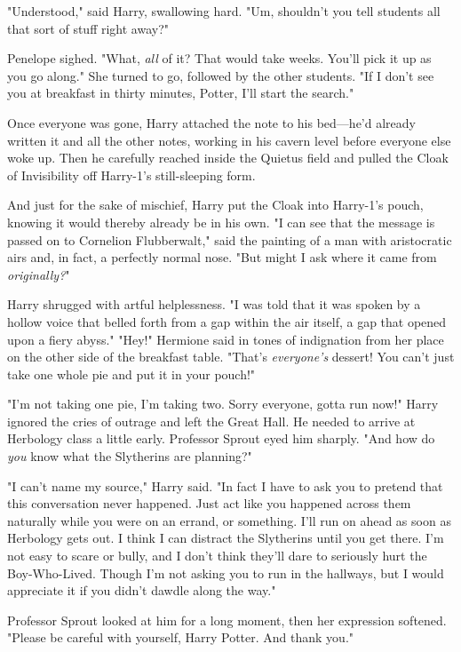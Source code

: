 "Understood," said Harry, swallowing hard. "Um, shouldn't you tell students all
that sort of stuff right away?"

Penelope sighed. "What, \emph{all} of it? That would take weeks. You'll pick it
up as you go along." She turned to go, followed by the other students. "If I
don't see you at breakfast in thirty minutes, Potter, I'll start the search."

Once everyone was gone, Harry attached the note to his bed—he'd already
written it and all the other notes, working in his cavern level before everyone
else woke up. Then he carefully reached inside the Quietus field and pulled the
Cloak of Invisibility off Harry-1's still-sleeping form.

And just for the sake of mischief, Harry put the Cloak into Harry-1's pouch,
knowing it would thereby already be in his own.
\sbreak
"I can see that the message is passed on to Cornelion Flubberwalt," said the
painting of a man with aristocratic airs and, in fact, a perfectly normal nose.
"But might I ask where it came from \emph{originally?}"

Harry shrugged with artful helplessness. "I was told that it was spoken by a
hollow voice that belled forth from a gap within the air itself, a gap that
opened upon a fiery abyss."
\sbreak
"Hey!" Hermione said in tones of indignation from her place on the other side
of the breakfast table. "That's \emph{everyone's} dessert! You can't just take
one whole pie and put it in your pouch!"

"I'm not taking one pie, I'm taking two. Sorry everyone, gotta run now!" Harry
ignored the cries of outrage and left the Great Hall. He needed to arrive at
Herbology class a little early.
\sbreak
Professor Sprout eyed him sharply. "And how do \emph{you} know what the
Slytherins are planning?"

"I can't name my source," Harry said. "In fact I have to ask you to pretend
that this conversation never happened. Just act like you happened across them
naturally while you were on an errand, or something. I'll run on ahead as soon
as Herbology gets out. I think I can distract the Slytherins until you get
there. I'm not easy to scare or bully, and I don't think they'll dare to
seriously hurt the Boy-Who-Lived. Though{\el} I'm not asking you to run in
the hallways, but I would appreciate it if you didn't dawdle along the way."

Professor Sprout looked at him for a long moment, then her expression softened.
"Please be careful with yourself, Harry Potter. And{\el} thank you."

